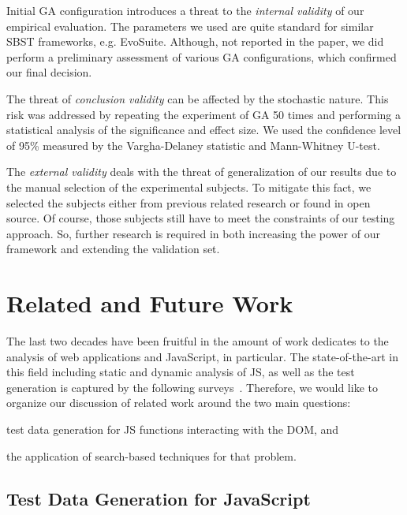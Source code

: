 \documentclass[sigconf,review]{acmart}
\begin{document}
Initial GA configuration introduces a threat to the \emph{internal validity} of our empirical evaluation. The parameters we used are quite standard for similar SBST frameworks, e.g. EvoSuite. Although, not reported in the paper, we did perform a preliminary assessment of various GA configurations, which confirmed our final decision.

The threat of \emph{conclusion validity} can be affected by the stochastic nature. This risk was addressed by repeating the experiment of GA 50 times and performing a statistical analysis of the significance and effect size. We used the confidence level of 95\% measured by the Vargha-Delaney statistic and Mann-Whitney U-test. 

The \emph{external validity} deals with the threat of generalization of our results due to the manual selection of the experimental subjects. To mitigate this fact, we selected the subjects either from previous  related research or found in open source. Of course, those subjects still have to meet the constraints of our testing approach. So, further research is required in both increasing the power of our framework and extending the validation set.


\section{Related and Future Work}
\label{sec:related.work}

The last two decades have been fruitful in the amount of work dedicates to the analysis of web applications and JavaScript, in particular. The state-of-the-art in this field including static and dynamic analysis of JS, as well as the test generation is captured by the following surveys~\cite{andreasen2017survey, sun2017analysis, mesbah2015advances}. Therefore, we would like to organize our discussion of related work around the two main questions: 
\begin{enumerate*}
\item test data generation for JS functions interacting with the DOM, and
\item the application of search-based techniques for that problem.
\end{enumerate*}  

\subsection{Test Data Generation for JavaScript}
\end{document}

